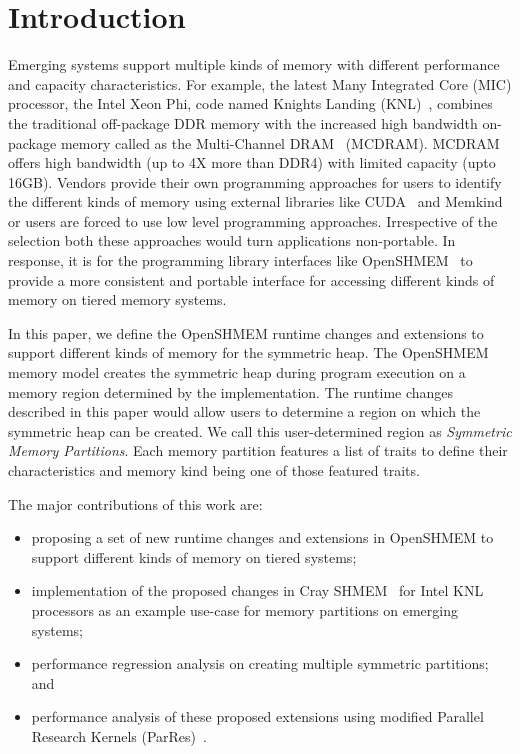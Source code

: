 \section{Introduction}
\label{src:intro}

Emerging systems support multiple kinds of memory with different
performance and capacity characteristics. For example, the latest
Many Integrated Core (MIC) processor, the Intel Xeon Phi,
code named Knights Landing (KNL)~\cite{KNL}, combines the traditional
off-package DDR memory with the increased high bandwidth on-package
memory called as the Multi-Channel DRAM~\cite{MCDRAM} (MCDRAM). MCDRAM
offers high bandwidth (up to 4X more than DDR4) with limited
capacity (upto 16GB). Vendors provide their own programming approaches
for users to identify the different kinds of memory using external
libraries like CUDA~\cite{cuda} and Memkind~\cite{memkind} or users
are forced to use low level programming approaches. Irrespective of the
selection both these approaches would turn applications non-portable.
In response, it is for the programming library interfaces like
OpenSHMEM~\cite{osm} to provide a more consistent and portable interface
for accessing different kinds of memory on tiered memory systems.

In this paper, we define the OpenSHMEM runtime changes and extensions
to support different kinds of memory for the symmetric heap. The
OpenSHMEM memory model creates the symmetric heap during program
execution on a memory region determined by the implementation. The
runtime changes described in this paper would allow users to determine
a region on which the symmetric heap can be created. We call this
user-determined region as \emph{Symmetric Memory Partitions}. Each
memory partition features a list of traits to define their
characteristics and memory kind being one of those featured traits.

The major contributions of this work are:
\begin{itemize}
    \item proposing a set of new runtime changes and extensions in
    OpenSHMEM to support different kinds of memory on tiered systems;
    \item implementation of the proposed changes in
    Cray SHMEM~\cite{csma} for Intel KNL processors as an example
    use-case for memory partitions on emerging systems;
    \item performance regression analysis on creating multiple symmetric
    partitions; and
    \item performance analysis of these proposed extensions using
    modified Parallel Research Kernels (ParRes)~\cite{parres}.
\end{itemize}

